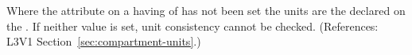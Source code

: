 Where the  attribute on a \Compartment having
 of  has not been set the units
are the  declared on the \Model.  If neither
value is set, unit consistency cannot be checked.  (References: 
L3V1 Section~\ref{sec:compartment-units}.)
